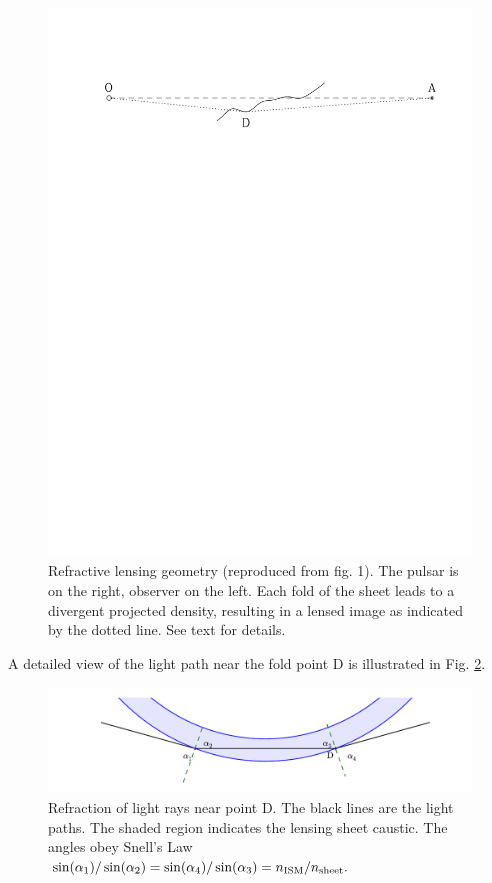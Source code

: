\documentclass[useAMS,usenatbib]{mn2e}
\begin{document}
\begin{figure}
\vspace{-0.8in}
\includegraphics[width=1.0\textwidth, angle=0]{sheetgeom.pdf}
\vspace{-7.0in}
\caption{Refractive lensing geometry 
(reproduced from \citet{2014MNRAS.442.3338P}
  fig. 1).  The pulsar is on the right, observer on the left.  Each
  fold of the sheet leads to a divergent projected density, resulting
  in a lensed image as indicated by the dotted line. See text for details.
}
\label{fig:sheetgeom}
\end{figure}
A detailed view of the light path near the fold point D is illustrated
in Fig. \ref{fig:refractionD}. 
\begin{figure}
\includegraphics[width=1.0\textwidth, angle=0]{refraction.pdf}
\caption{Refraction of light rays near point D.  The black lines
  are the light paths.  The shaded region indicates the lensing sheet
  caustic.  The angles obey Snell's Law
  $\sin(\alpha_1)/\sin(\alpha_2)=\sin(\alpha_4)/\sin(\alpha_3)=n_{\rm
    ISM}/n_{\rm sheet}.$ 
}
\label{fig:refractionD}
\end{figure}
\end{document}
